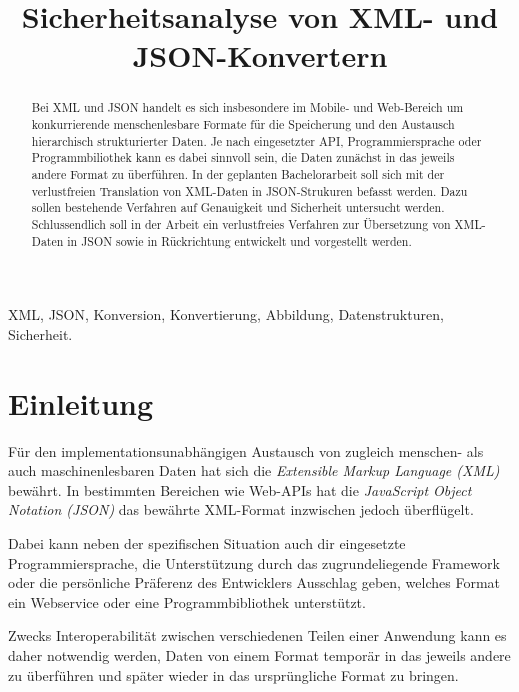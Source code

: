\documentclass[conference]{template/IEEEtran}
\begin{document}
\title{Sicherheitsanalyse von XML- und JSON-Konvertern}
\author{
}
\maketitle
\begin{abstract}
Bei XML und JSON handelt es sich insbesondere im Mobile- und Web-Bereich um
konkurrierende menschenlesbare Formate für die Speicherung und den
Austausch hierarchisch strukturierter Daten. Je nach eingesetzter API,
Programmiersprache oder Programmbiliothek kann es dabei sinnvoll sein, die
Daten zunächst in das jeweils andere Format zu überführen. In der geplanten
Bachelorarbeit soll sich mit der verlustfreien Translation von XML-Daten in
JSON-Strukuren befasst werden. Dazu sollen bestehende Verfahren auf Genauigkeit
und Sicherheit untersucht werden. Schlussendlich soll in der Arbeit ein
verlustfreies Verfahren zur Übersetzung von XML-Daten in JSON sowie in
Rückrichtung entwickelt und vorgestellt werden.
\end{abstract}
\begin{IEEEkeywords}
XML, JSON, Konversion, Konvertierung, Abbildung, Datenstrukturen, Sicherheit.
\end{IEEEkeywords}
\IEEEpeerreviewmaketitle{}
\section{Einleitung}
\label{sec:intro}
Für den implementationsunabhängigen Austausch von zugleich menschen- als auch
maschinenlesbaren Daten hat sich die \emph{Extensible Markup Language (XML)}
bewährt. In bestimmten Bereichen wie Web-APIs hat die \emph{JavaScript Object
Notation (JSON)} das bewährte XML-Format inzwischen jedoch überflügelt.

Dabei kann neben der spezifischen Situation auch dir eingesetzte
Programmiersprache, die Unterstützung durch das zugrundeliegende Framework
oder die persönliche Präferenz des Entwicklers Ausschlag geben, welches Format
ein Webservice oder eine Programmbibliothek unterstützt.

Zwecks Interoperabilität zwischen verschiedenen Teilen einer Anwendung kann es
daher notwendig werden, Daten von einem Format temporär in das jeweils andere
zu überführen und später wieder in das ursprüngliche Format zu bringen.
\end{document}
